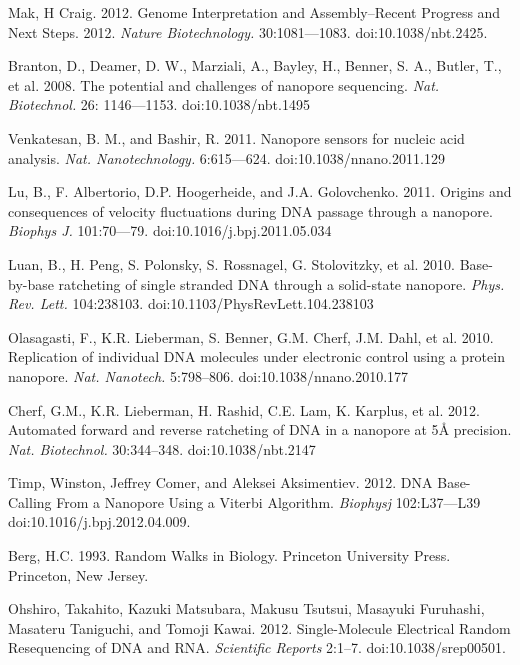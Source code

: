 \documentclass{biophys_letter}
\begin{document}
\begin{thebibliography}{99}

  Mak, H Craig. 
  2012.
  Genome Interpretation and Assembly--Recent Progress and Next Steps.
  2012.
  {\it Nature Biotechnology.}
  30:1081---1083.
  doi:10.1038/nbt.2425.

  Branton, D., Deamer, D. W., Marziali, A., Bayley, H., Benner, S. A., Butler, T., et al.
  2008.
  The potential and challenges of nanopore sequencing.
  {\it Nat. Biotechnol.}
  26: 1146---1153.
  doi:10.1038/nbt.1495

  Venkatesan, B. M., and Bashir, R.
  2011.
  Nanopore sensors for nucleic acid analysis.
  {\it Nat. Nanotechnology.}
  6:615---624.
  doi:10.1038/nnano.2011.129

  Lu, B., F. Albertorio, D.P. Hoogerheide, and J.A. Golovchenko.
  2011.
  Origins and consequences of velocity fluctuations during DNA passage through a nanopore.
  {\it Biophys J.}
  101:70---79.
  doi:10.1016/j.bpj.2011.05.034

  Luan, B., H. Peng, S. Polonsky, S. Rossnagel, G. Stolovitzky, et al.
  2010.
  Base-by-base ratcheting of single stranded DNA through a solid-state nanopore.
  {\it Phys. Rev. Lett.}
  104:238103.
  doi:10.1103/PhysRevLett.104.238103

  Olasagasti, F., K.R. Lieberman, S. Benner, G.M. Cherf, J.M. Dahl, et al.
  2010.
  Replication of individual DNA molecules under electronic control using a protein nanopore.
  {\it Nat. Nanotech.}
  5:798--806.
  doi:10.1038/nnano.2010.177

  Cherf, G.M., K.R. Lieberman, H. Rashid, C.E. Lam, K. Karplus, et al.
  2012.
  Automated forward and reverse ratcheting of DNA in a nanopore at 5{\AA} precision.
  {\it Nat. Biotechnol.}
  30:344--348.
  doi:10.1038/nbt.2147

  Timp, Winston, Jeffrey Comer, and Aleksei Aksimentiev. 
  2012.
  DNA Base-Calling From a Nanopore Using a Viterbi Algorithm.
  {\it Biophysj}
  102:L37---L39
  doi:10.1016/j.bpj.2012.04.009.

  Berg, H.C.
  1993.
  Random Walks in Biology.
  Princeton University Press.
  Princeton, New Jersey.

  Ohshiro, Takahito, Kazuki Matsubara, Makusu Tsutsui, Masayuki Furuhashi, Masateru Taniguchi, and Tomoji Kawai. 
  2012.
  Single-Molecule Electrical Random Resequencing of DNA and RNA.
  {\it Scientific Reports} 
  2:1--7.
  doi:10.1038/srep00501.


\end{thebibliography}
\end{document}
